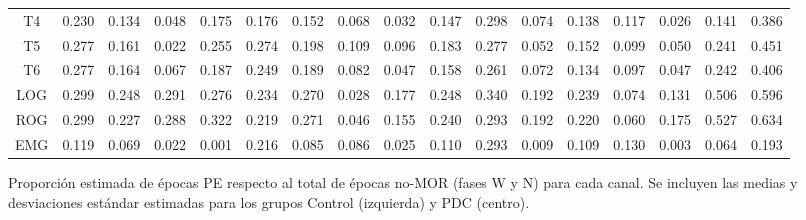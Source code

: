 \documentclass[12pt,a4paper]{mitthesis}
\begin{document}
\begin{SidewaysFigure}
\begin{tabular}{c||ccccc|cc||cccc|cc||ccc}
T4&0.230&0.134&0.048&0.175&0.176&0.152&0.068&0.032&0.147&0.298&0.074&0.138&0.117&0.026&0.141&0.386 \\
T5&0.277&0.161&0.022&0.255&0.274&0.198&0.109&0.096&0.183&0.277&0.052&0.152&0.099&0.050&0.241&0.451 \\
T6&0.277&0.164&0.067&0.187&0.249&0.189&0.082&0.047&0.158&0.261&0.072&0.134&0.097&0.047&0.242&0.406 \\
LOG&0.299&0.248&0.291&0.276&0.234&0.270&0.028&0.177&0.248&0.340&0.192&0.239&0.074&0.131&0.506&0.596 \\
ROG&0.299&0.227&0.288&0.322&0.219&0.271&0.046&0.155&0.240&0.293&0.192&0.220&0.060&0.175&0.527&0.634 \\
EMG&0.119&0.069&0.022&0.001&0.216&0.085&0.086&0.025&0.110&0.293&0.009&0.109&0.130&0.003&0.064&0.193
\end{tabular}
\caption{Proporci\'on estimada de \'epocas PE respecto al total de \'epocas no-MOR 
(fases W y N) para cada
canal. Se incluyen las medias y desviaciones est\'andar estimadas para los grupos 
Control (izquierda) y PDC (centro).}
\label{gpos_nmor}
\end{SidewaysFigure}
\end{document}

